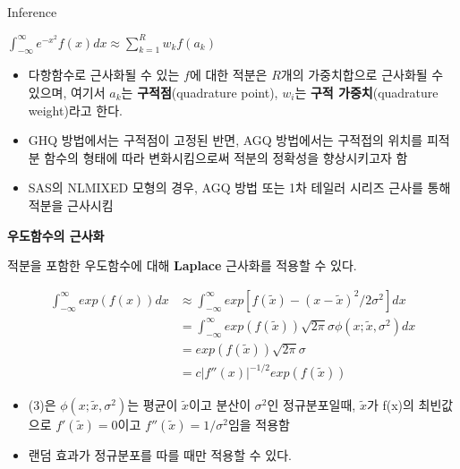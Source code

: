 \documentclass[9pt, xelatex]{beamer}
\begin{document}
{\begin{frame}[allowframebreaks]{Inference}
		\begin{center}
			$\int^{\infty}_{-\infty} e^{-x^{2}}f(x)dx \approx \sum^{R}_{k=1}w_{k}f(a_{k})$
		\end{center}
		
		\begin{itemize}
			\item 다항함수로 근사화될 수 있는 $f$에 대한 적분은 $R$개의 가중치합으로 근사화될 수 있으며, 여기서 $a_{k}$는 \textbf{구적점}(quadrature point), $w_{i}$는 \textbf{구적 가중치}(quadrature weight)라고 한다.
			\item GHQ 방법에서는 구적점이 고정된 반면, AGQ 방법에서는 구적접의 위치를 피적분 함수의 형태에 따라 변화시킴으로써 적분의 정확성을 향상시키고자 함
			\item SAS의 NLMIXED 모형의 경우, AGQ 방법 또는 1차 테일러 시리즈 근사를 통해 적분을 근사시킴
		\end{itemize}
	
	\pagebreak
	\textbf{우도함수의 근사화}
	\vspace{4mm}
	
	적분을 포함한 우도함수에 대해 \textbf{Laplace} 근사화를 적용할 수 있다.
	\vspace{2mm}
	
	\begin{center}
	\begin{align}
		\int^{\infty}_{-\infty} exp(f(x))dx & \approx \int^{\infty}_{-\infty} exp[{f(\tilde{x})-(x-\tilde{x})^{2}}/{2\sigma^{2}}]dx \\
		& =\int^{\infty}_{-\infty}exp(f({\tilde{x}}))\sqrt{2\pi}\sigma\phi(x;\tilde{x},\sigma^{2})dx \\ 
		& =exp(f(\tilde{x}))\sqrt{2\pi}\sigma \\
		& =c|f''(x)|^{-1/2}exp(f(\tilde{x}))
	\end{align}	
	\end{center}
	
	\begin{itemize}
		\item (3)은 $\phi(x;\tilde{x},\sigma^{2})$는 평균이 $\tilde{x}$이고 분산이 $\sigma^{2}$인 정규분포일때, $\tilde{x}$가 f(x)의 최빈값으로 $f'(\tilde{x})=0$이고 $f''(\tilde{x})=1/\sigma^{2}$임을 적용함
		\item 랜덤 효과가 정규분포를 따를 때만 적용할 수 있다.
	\end{itemize}
	\end{frame}}
\end{document}
